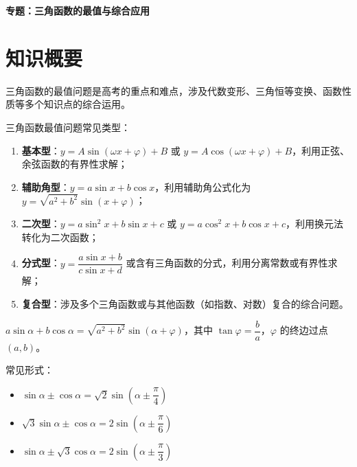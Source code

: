 \documentclass[11pt]{ctexrep}
\begin{document}
\begin{center}
    {\LARGE\bfseries 专题：三角函数的最值与综合应用}
\end{center}

\section*{知识概要}

三角函数的最值问题是高考的重点和难点，涉及代数变形、三角恒等变换、函数性质等多个知识点的综合运用。

\begin{definition}[三角函数最值的基本类型]
    三角函数最值问题常见类型：
    \begin{enumerate}
        \item \textbf{基本型}：$y = A\sin(\omega x + \varphi) + B$ 或 $y = A\cos(\omega x + \varphi) + B$，利用正弦、余弦函数的有界性求解；
        \item \textbf{辅助角型}：$y = a\sin x + b\cos x$，利用辅助角公式化为 $y = \sqrt{a^2 + b^2}\sin(x + \varphi)$；
        \item \textbf{二次型}：$y = a\sin^2 x + b\sin x + c$ 或 $y = a\cos^2 x + b\cos x + c$，利用换元法转化为二次函数；
        \item \textbf{分式型}：$y = \dfrac{a\sin x + b}{c\sin x + d}$ 或含有三角函数的分式，利用分离常数或有界性求解；
        \item \textbf{复合型}：涉及多个三角函数或与其他函数（如指数、对数）复合的综合问题。
    \end{enumerate}
\end{definition}

\begin{property}[辅助角公式]
    $a\sin\alpha + b\cos\alpha = \sqrt{a^2 + b^2}\sin(\alpha + \varphi)$，其中 $\tan\varphi = \dfrac{b}{a}$，$\varphi$ 的终边过点 $(a, b)$。
    
    常见形式：
    \begin{itemize}
        \item $\sin\alpha \pm \cos\alpha = \sqrt{2}\sin\left(\alpha \pm \dfrac{\pi}{4}\right)$
        \item $\sqrt{3}\sin\alpha \pm \cos\alpha = 2\sin\left(\alpha \pm \dfrac{\pi}{6}\right)$
        \item $\sin\alpha \pm \sqrt{3}\cos\alpha = 2\sin\left(\alpha \pm \dfrac{\pi}{3}\right)$
    \end{itemize}
\end{property}
\end{document}
